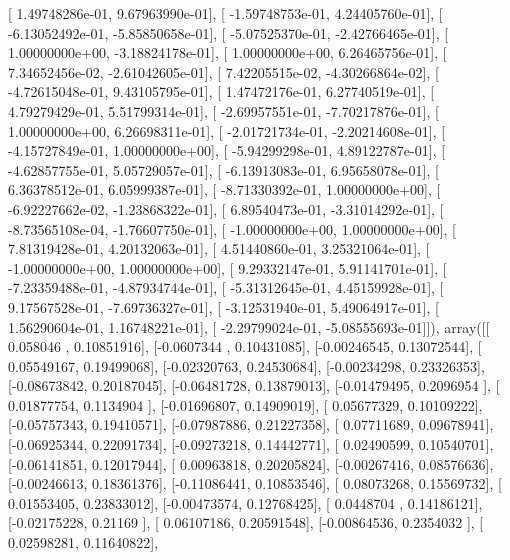 \documentclass{article}
\begin{document}
       [  1.49748286e-01,   9.67963990e-01],
       [ -1.59748753e-01,   4.24405760e-01],
       [ -6.13052492e-01,  -5.85850658e-01],
       [ -5.07525370e-01,  -2.42766465e-01],
       [  1.00000000e+00,  -3.18824178e-01],
       [  1.00000000e+00,   6.26465756e-01],
       [  7.34652456e-02,  -2.61042605e-01],
       [  7.42205515e-02,  -4.30266864e-02],
       [ -4.72615048e-01,   9.43105795e-01],
       [  1.47472176e-01,   6.27740519e-01],
       [  4.79279429e-01,   5.51799314e-01],
       [ -2.69957551e-01,  -7.70217876e-01],
       [  1.00000000e+00,   6.26698311e-01],
       [ -2.01721734e-01,  -2.20214608e-01],
       [ -4.15727849e-01,   1.00000000e+00],
       [ -5.94299298e-01,   4.89122787e-01],
       [ -4.62857755e-01,   5.05729057e-01],
       [ -6.13913083e-01,   6.95658078e-01],
       [  6.36378512e-01,   6.05999387e-01],
       [ -8.71330392e-01,   1.00000000e+00],
       [ -6.92227662e-02,  -1.23868322e-01],
       [  6.89540473e-01,  -3.31014292e-01],
       [ -8.73565108e-04,  -1.76607750e-01],
       [ -1.00000000e+00,   1.00000000e+00],
       [  7.81319428e-01,   4.20132063e-01],
       [  4.51440860e-01,   3.25321064e-01],
       [ -1.00000000e+00,   1.00000000e+00],
       [  9.29332147e-01,   5.91141701e-01],
       [ -7.23359488e-01,  -4.87934744e-01],
       [ -5.31312645e-01,   4.45159928e-01],
       [  9.17567528e-01,  -7.69736327e-01],
       [ -3.12531940e-01,   5.49064917e-01],
       [  1.56290604e-01,   1.16748221e-01],
       [ -2.29799024e-01,  -5.08555693e-01]]), array([[ 0.058046  ,  0.10851916],
       [-0.0607344 ,  0.10431085],
       [-0.00246545,  0.13072544],
       [ 0.05549167,  0.19499068],
       [-0.02320763,  0.24530684],
       [-0.00234298,  0.23326353],
       [-0.08673842,  0.20187045],
       [-0.06481728,  0.13879013],
       [-0.01479495,  0.2096954 ],
       [ 0.01877754,  0.1134904 ],
       [-0.01696807,  0.14909019],
       [ 0.05677329,  0.10109222],
       [-0.05757343,  0.19410571],
       [-0.07987886,  0.21227358],
       [ 0.07711689,  0.09678941],
       [-0.06925344,  0.22091734],
       [-0.09273218,  0.14442771],
       [ 0.02490599,  0.10540701],
       [-0.06141851,  0.12017944],
       [ 0.00963818,  0.20205824],
       [-0.00267416,  0.08576636],
       [-0.00246613,  0.18361376],
       [-0.11086441,  0.10853546],
       [ 0.08073268,  0.15569732],
       [ 0.01553405,  0.23833012],
       [-0.00473574,  0.12768425],
       [ 0.0448704 ,  0.14186121],
       [-0.02175228,  0.21169   ],
       [ 0.06107186,  0.20591548],
       [-0.00864536,  0.2354032 ],
       [ 0.02598281,  0.11640822],
\end{document}
